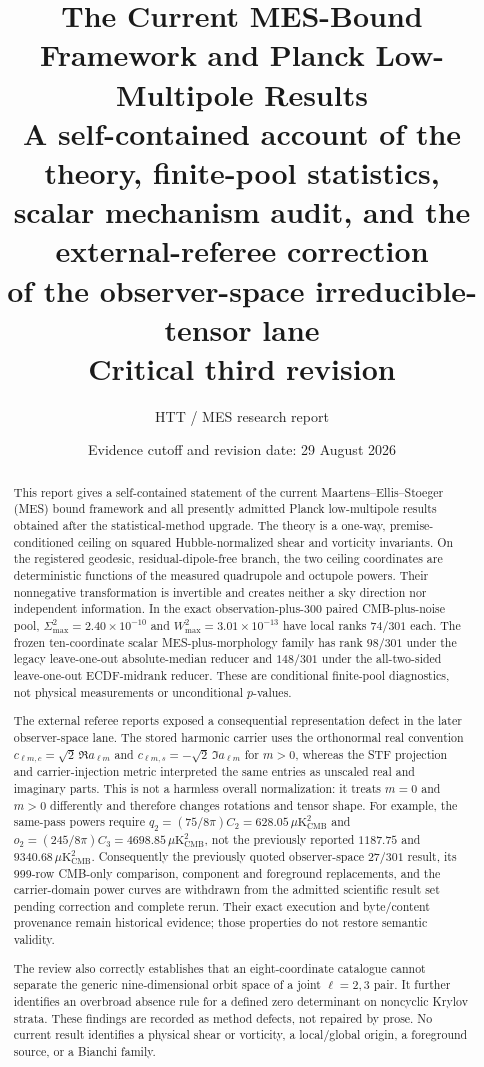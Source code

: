 \documentclass[11pt,a4paper]{article}
\title{\textbf{The Current MES-Bound Framework and Planck Low-Multipole Results}\\[0.35em]
\large A self-contained account of the theory, finite-pool statistics,\\
scalar mechanism audit, and the external-referee correction\\
of the observer-space irreducible-tensor lane\\[0.25em]
\normalsize Critical third revision}
\author{HTT / MES research report}
\date{Evidence cutoff and revision date: 29 August 2026}
\newcommand{\microK}{\mu\mathrm{K}_{\mathrm{CMB}}}
\begin{document}
\maketitle

\begin{abstract}
This report gives a self-contained statement of the current
Maartens--Ellis--Stoeger (MES) bound framework and all presently admitted
Planck low-multipole results obtained after the statistical-method upgrade.
The theory is a one-way, premise-conditioned ceiling on squared
Hubble-normalized shear and vorticity invariants.  On the registered geodesic,
residual-dipole-free branch, the two ceiling coordinates are deterministic
functions of the measured quadrupole and octupole powers.  Their nonnegative
transformation is invertible and creates neither a sky direction nor independent
information.  In the exact observation-plus-300 paired CMB-plus-noise pool,
$\Sigma^2_{\max}=2.40\times10^{-10}$ and
$W^2_{\max}=3.01\times10^{-13}$ have local ranks $74/301$ each.  The frozen
ten-coordinate scalar MES-plus-morphology family has rank $98/301$ under the
legacy leave-one-out absolute-median reducer and $148/301$ under the
all-two-sided leave-one-out ECDF-midrank reducer.  These are conditional
finite-pool diagnostics, not physical measurements or unconditional
$p$-values.

The external referee reports exposed a consequential representation defect in
the later observer-space lane.  The stored harmonic carrier uses the
orthonormal real convention
$c_{\ell m,c}=\sqrt2\,\Re a_{\ell m}$ and
$c_{\ell m,s}=-\sqrt2\,\Im a_{\ell m}$ for $m>0$, whereas the STF projection
and carrier-injection metric interpreted the same entries as unscaled real and
imaginary parts.  This is not a harmless overall normalization: it treats
$m=0$ and $m>0$ differently and therefore changes rotations and tensor shape.
For example, the same-pass powers require
$q_2=(75/8\pi)C_2=628.05\,\microK^2$ and
$o_2=(245/8\pi)C_3=4698.85\,\microK^2$, not the previously reported
$1187.75$ and $9340.68\,\microK^2$.  Consequently the previously quoted
observer-space $27/301$ result, its 999-row CMB-only comparison, component and
foreground replacements, and the carrier-domain power curves are withdrawn
from the admitted scientific result set pending correction and complete
rerun.  Their exact execution and byte/content provenance remain historical
evidence; those properties do not restore semantic validity.

The review also correctly establishes that an eight-coordinate catalogue
cannot separate the generic nine-dimensional orbit space of a joint
$\ell=2,3$ pair.  It further identifies an overbroad absence rule for a defined
zero determinant on noncyclic Krylov strata.  These findings are recorded as
method defects, not repaired by prose.  No current result identifies a
physical shear or vorticity, a local/global origin, a foreground source, or a
Bianchi family.
\end{abstract}
\end{document}
